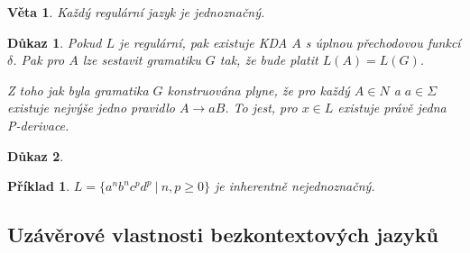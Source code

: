 \documentclass[10pt, a4paper, titlepage]{article}
\theoremstyle{note}
\newtheorem{veta}{Věta}
\newtheorem{dukaz}{Důkaz}
\newtheorem{priklad}{Příklad}
\begin{document}
\begin{veta}
Každý regulární jazyk je jednoznačný.
\end{veta}

\begin{dukaz}
Pokud $L$ je regulární, pak existuje KDA $A$ s úplnou přechodovou funkcí $\delta$. Pak pro $A$ lze sestavit gramatiku $G$ tak, že bude platit $L(A) = L(G)$.

Z toho jak byla gramatika $G$ konstruována plyne, že pro každý $A \in N$ a $a\in\Sigma$ existuje nejvýše jedno pravidlo $A \rightarrow aB$. To jest, pro $x \in L$ existuje právě jedna P-derivace.
\end{dukaz}

\begin{dukaz}

\end{dukaz}

\begin{priklad}
$L=\lbrace a^nb^nc^pd^p\ |\ n,p\ge 0\rbrace$ je inherentně nejednoznačný.
\end{priklad}

\subsection{Uzávěrové vlastnosti bezkontextových jazyků}
\end{document}
